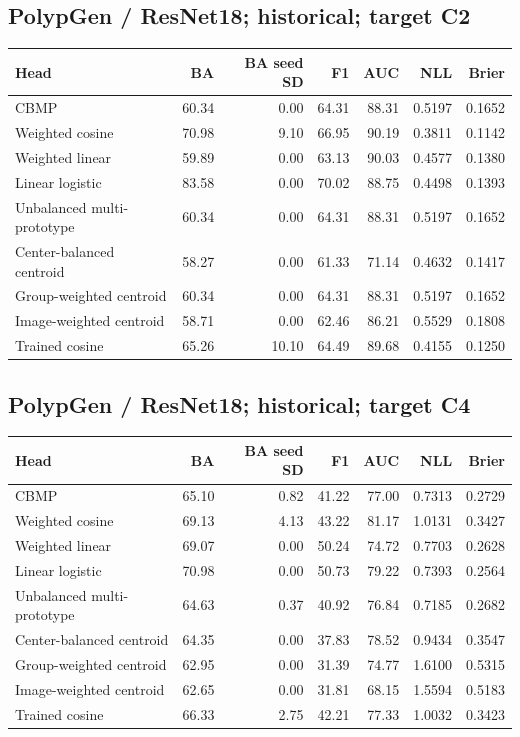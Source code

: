 \subsection*{PolypGen / ResNet18; historical; target C2}
\begingroup\small\setlength{\tabcolsep}{3pt}
\begin{longtable}{lrrrrrr}
\toprule Head & BA & BA seed SD & F1 & AUC & NLL & Brier \\
\midrule
CBMP & 60.34 & 0.00 & 64.31 & 88.31 & 0.5197 & 0.1652 \\
Weighted cosine & 70.98 & 9.10 & 66.95 & 90.19 & 0.3811 & 0.1142 \\
Weighted linear & 59.89 & 0.00 & 63.13 & 90.03 & 0.4577 & 0.1380 \\
Linear logistic & 83.58 & 0.00 & 70.02 & 88.75 & 0.4498 & 0.1393 \\
Unbalanced multi-prototype & 60.34 & 0.00 & 64.31 & 88.31 & 0.5197 & 0.1652 \\
Center-balanced centroid & 58.27 & 0.00 & 61.33 & 71.14 & 0.4632 & 0.1417 \\
Group-weighted centroid & 60.34 & 0.00 & 64.31 & 88.31 & 0.5197 & 0.1652 \\
Image-weighted centroid & 58.71 & 0.00 & 62.46 & 86.21 & 0.5529 & 0.1808 \\
Trained cosine & 65.26 & 10.10 & 64.49 & 89.68 & 0.4155 & 0.1250 \\
\bottomrule
\end{longtable}
\endgroup
\subsection*{PolypGen / ResNet18; historical; target C4}
\begingroup\small\setlength{\tabcolsep}{3pt}
\begin{longtable}{lrrrrrr}
\toprule Head & BA & BA seed SD & F1 & AUC & NLL & Brier \\
\midrule
CBMP & 65.10 & 0.82 & 41.22 & 77.00 & 0.7313 & 0.2729 \\
Weighted cosine & 69.13 & 4.13 & 43.22 & 81.17 & 1.0131 & 0.3427 \\
Weighted linear & 69.07 & 0.00 & 50.24 & 74.72 & 0.7703 & 0.2628 \\
Linear logistic & 70.98 & 0.00 & 50.73 & 79.22 & 0.7393 & 0.2564 \\
Unbalanced multi-prototype & 64.63 & 0.37 & 40.92 & 76.84 & 0.7185 & 0.2682 \\
Center-balanced centroid & 64.35 & 0.00 & 37.83 & 78.52 & 0.9434 & 0.3547 \\
Group-weighted centroid & 62.95 & 0.00 & 31.39 & 74.77 & 1.6100 & 0.5315 \\
Image-weighted centroid & 62.65 & 0.00 & 31.81 & 68.15 & 1.5594 & 0.5183 \\
Trained cosine & 66.33 & 2.75 & 42.21 & 77.33 & 1.0032 & 0.3423 \\
\bottomrule
\end{longtable}
\endgroup

